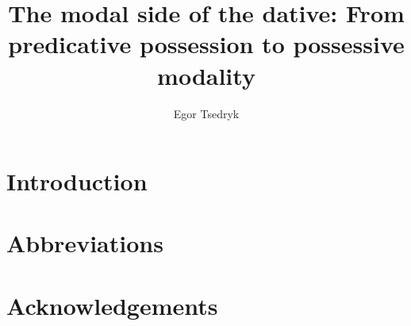 \documentclass[output=paper]{langsci/langscibook}
\author{Egor Tsedryk	\affiliation{}}
\title{The modal side of the dative: From predicative possession to possessive modality}
\begin{document}
\section{Introduction}  
 
\section*{Abbreviations}
\section*{Acknowledgements}

\sloppy
\printbibliography[heading=subbibliography,notkeyword=this] 
\end{document}
